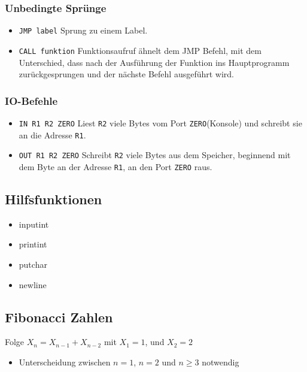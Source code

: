 \subsubsection{Unbedingte Sprünge}
 \begin{itemize}
 \item \texttt{JMP label}
 Sprung zu einem Label.
 \item \texttt{CALL funktion} 
 Funktionsaufruf ähnelt dem JMP Befehl, mit dem Unterschied, dass nach der
Ausführung der Funktion ins Hauptprogramm zurückgesprungen und der nächste
Befehl ausgeführt wird.
 \end{itemize}
\subsubsection{IO-Befehle}
 \begin{itemize}
 \item \texttt{IN R1 R2 ZERO}
 Liest \texttt{R2} viele Bytes vom Port \texttt{ZERO}(Konsole) und schreibt sie
an die Adresse \texttt{R1}.
 \item \texttt{OUT R1 R2 ZERO}
 Schreibt \texttt{R2} viele Bytes aus dem Speicher, beginnend mit dem Byte an
der Adresse \texttt{R1}, an den Port \texttt{ZERO} raus.
 \end{itemize}





\subsection{Hilfsfunktionen}
 \begin{itemize}
 \item inputint
 \item printint
 \item putchar
 \item newline
 \end{itemize}



\subsection{Fibonacci Zahlen}

 Folge $X_{n} = X_{n-1} + X_{n-2}$
 mit $X_{1} = 1$, und $X_{2} = 2$
 \begin{itemize}
 \item Unterscheidung zwischen $n = 1$, $n = 2$ und $n \geq 3$ notwendig
 \end{itemize}


